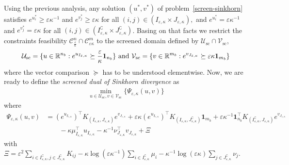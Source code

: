 Using the previous analysis, any solution $(u^*, v^*)$ of problem~\eqref{screen-sinkhorn} satisfies $e^{u^*_i} \geq \varepsilon\kappa^{-1}$ and $e^{v^*_j} \geq \varepsilon\kappa$ for all $(i,j) \in (I_{\varepsilon,\kappa}\times J_{\varepsilon,\kappa}),$ and $e^{u^*_i} = \varepsilon\kappa^{-1}$ and $e^{v^*_j} = \varepsilon\kappa$ for all $(i,j) \in (I^\complement_{\varepsilon,\kappa}\times J^\complement_{\varepsilon,\kappa})$.
Basing on that facts we restrict the constraints feasibility $\mathcal{C}^n_{\frac \varepsilon \kappa} \cap \mathcal{C}^m_{\varepsilon\kappa}$ to the screened domain defined by $\mathcal{U}_{\text{sc}} \cap \mathcal{V}_{\text{sc}}$, 
\begin{equation*}
\mathcal{U}_{\text{sc}} = \{u \in \R^{n_b}: e^{u_{I_{\varepsilon,\kappa}}} \succeq \frac \varepsilon\kappa\mathbf 1_{n_b}\} \text{ and } \mathcal{V}_{\text{sc}} =\{v\in\R^{m_b}: e^{v_{J_{\varepsilon,\kappa}}} \succeq \varepsilon\kappa \mathbf{1}_{m_b}\}%
\end{equation*}
where the vector comparison $\succeq$ has to be understood elementwise.
Now, we are ready to define the \emph{screened dual of Sinkhorn divergence} as
\begin{align}
\label{screen-sinkhorn_second_def}
\min_{u \in \mathcal{U}_{\text{sc}}, v \in \mathcal{V}_{\text{sc}}}\{\Psi_{\varepsilon, \kappa}(u,v)\}
\end{align}
where 
\begin{align*} 
\Psi_{\varepsilon,\kappa}(u, v) &= (e^{u_{I_{\varepsilon,\kappa}}})^\top K_{(I_{\varepsilon,\kappa}, J_{\varepsilon,\kappa})} e^{v_{J_{\varepsilon,\kappa}}} + 
\varepsilon \kappa (e^{u_{I_{\varepsilon,\kappa}}})^\top K_{(I_{\varepsilon,\kappa}, J^\complement_{\varepsilon,\kappa})}\mathbf 1_{m_b} + \varepsilon \kappa^{-1} \mathbf 1_{n_b}^\top K_{(I^\complement_{\varepsilon,\kappa}, J_{\varepsilon,\kappa})}e^{v_{J_{\varepsilon,\kappa}}}\\
&\qquad - \kappa \mu_{I_{\varepsilon,\kappa}}^\top u_{I_{\varepsilon,\kappa}} - \kappa^{-1} \nu_{J_{\varepsilon,\kappa}}^\top v_{J_{\varepsilon,\kappa}} + \Xi
\end{align*}
with $\Xi = \varepsilon^2 \sum_{i \in I^\complement_{\varepsilon,\kappa}, j \in J^\complement_{\varepsilon,\kappa}} K_{ij} -\kappa \log(\varepsilon\kappa^{-1})\sum_{i \in I^\complement_{\varepsilon,\kappa}}\mu_i - \kappa^{-1} \log(\varepsilon\kappa)\sum_{j\in J^\complement_{\varepsilon,\kappa}} \nu_j$.

